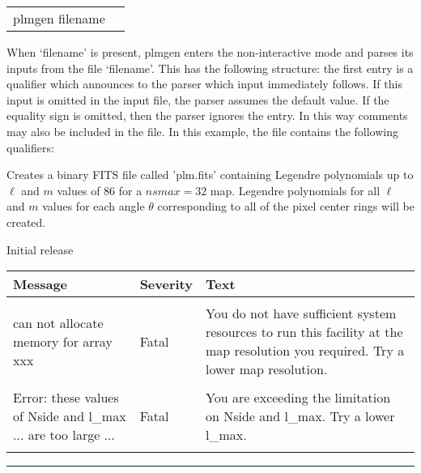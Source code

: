 \vfill\newpage

\begin{examples}{2}
{
\begin{tabular}{ll} %
plmgen  filename \\
\end{tabular}
}
{When `filename' is present, plmgen enters the non-interactive mode 
and parses
its inputs from the file `filename'. This has the following
structure: the first entry is a qualifier which announces to the parser
which input immediately follows. If this input is omitted in the
input file, the parser assumes the default value.
If the equality sign is omitted, then the parser ignores the entry.
In this way comments may also be included in the file.
In this example, the file contains the following qualifiers:\hfill\newline
{}
}

Creates a binary FITS file called 'plm.fits' containing Legendre polynomials 
up to $\ell$ and $m$ values of 86 for a $nsmax=32$ map. 
Legendre polynomials for all $\ell$ and $m$ 
values for each angle $\theta$ corresponding to all of the \healpix
pixel center rings will be 
created.
\end{examples}

\begin{release}
  \begin{relist}
    \item Initial release 
  \end{relist}
\end{release}

\begin{messages}
{
\begin{tabular}{p{0.25\hsize} p{0.1\hsize} p{0.35\hsize}} \hline  
  \textbf{Message} & \textbf{Severity} & \textbf{Text} \\ \hline
                   &                   &   \\ %
can not allocate memory for array xxx &  Fatal & You do not have
                   sufficient system resources to run this
                   facility at the map resolution you required. 
  Try a lower map resolution.  \\ 
                   &                   &   \\ %
Error: these values of Nside and l\_max $\ldots$ are too large $\ldots$ &  Fatal & You are exceeding
the limitation on Nside and l\_max. 
  Try a lower l\_max.  \\ 
                   &                   &   \\ \hline %
\end{tabular}
} 
\end{messages}

\rule{\hsize}{2mm}

\newpage
